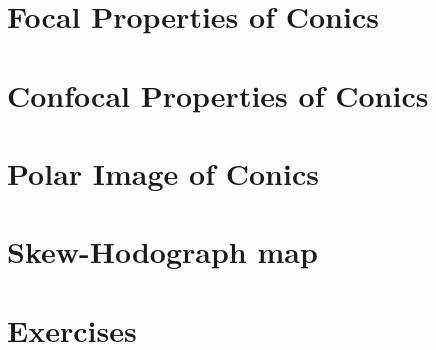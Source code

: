\section{Focal Properties of Conics}
\label{sec:09-focal}


\section{Confocal Properties of Conics}
\label{sec:09-confocal}



\section{Polar Image of Conics}
\label{sec:09-polarimage}


\section{Skew-Hodograph map}
\label{sec:09-hodograph}


\section{Exercises}
\label{sec:09-exercises}
